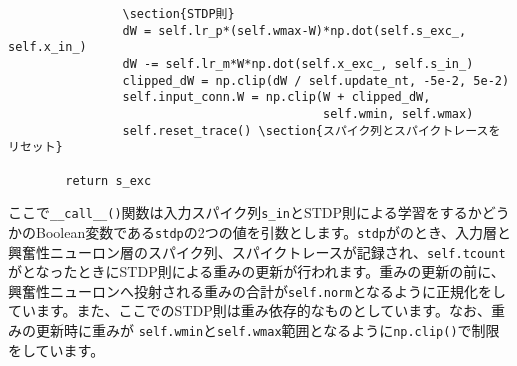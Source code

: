 \begin{verbatim}
                \section{STDP則}
                dW = self.lr_p*(self.wmax-W)*np.dot(self.s_exc_, self.x_in_)
                dW -= self.lr_m*W*np.dot(self.x_exc_, self.s_in_)
                clipped_dW = np.clip(dW / self.update_nt, -5e-2, 5e-2)
                self.input_conn.W = np.clip(W + clipped_dW,
                                            self.wmin, self.wmax)
                self.reset_trace() \section{スパイク列とスパイクトレースをリセット}
        
        return s_exc
\end{verbatim}
ここで\texttt{\_\_call\_\_()}関数は入力スパイク列\texttt{s\_in}とSTDP則による学習をするかどうかのBoolean変数である\texttt{stdp}の2つの値を引数とします。\texttt{stdp}がのとき、入力層と興奮性ニューロン層のスパイク列、スパイクトレースが記録され、\texttt{self.tcount}がとなったときにSTDP則による重みの更新が行われます。重みの更新の前に、興奮性ニューロンへ投射される重みの合計が\texttt{self.norm}となるように正規化をしています。また、ここでのSTDP則は重み依存的なものとしています。なお、重みの更新時に重みが
\texttt{self.wmin}と\texttt{self.wmax}範囲となるように\texttt{np.clip()}で制限をしています。

